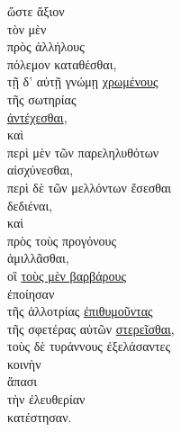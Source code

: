{\large
\begin{greek}
\noindent ὥστε ἄξιον \\
\tabto{2em} τὸν μὲν \\
\tabto{4em} πρὸς ἀλλήλους \\
\tabto{2em} πόλεμον καταθέσθαι, \\
\tabto{2em} τῇ δ' αὐτῇ γνώμῃ \underline{χρωμένους} \\
\tabto{4em} τῆς σωτηρίας \\
\tabto{2em} \underline{ἀντέχεσθαι},\\
\tabto{2em} καὶ \\
\tabto{4em} περὶ μὲν τῶν παρεληλυθότων \\
\tabto{6em} αἰσχύνεσθαι, \\
\tabto{4em} περὶ δὲ τῶν μελλόντων ἔσεσθαι \\
\tabto{6em} δεδιέναι, \\
\tabto{2em} καὶ \\
\tabto{4em} πρὸς τοὺς προγόνους \\
\tabto{6em} ἁμιλλᾶσθαι, \\
\tabto{8em} οἳ \underline{τοὺς μὲν βαρβάρους} \\
\tabto{8em} ἐποίησαν \\
\tabto{10em} τῆς ἀλλοτρίας \underline{ἐπιθυμοῦντας} \\
\tabto{10em} τῆς σφετέρας αὐτῶν \underline{στερεῖσθαι}, \\
\tabto{8em} τοὺς δὲ τυράννους ἐξελάσαντες \\
\tabto{8em} κοινὴν \\
\tabto{10em} ἅπασι \\
\tabto{8em} τὴν ἐλευθερίαν \\
\tabto{8em} κατέστησαν.\\

\end{greek}
}

